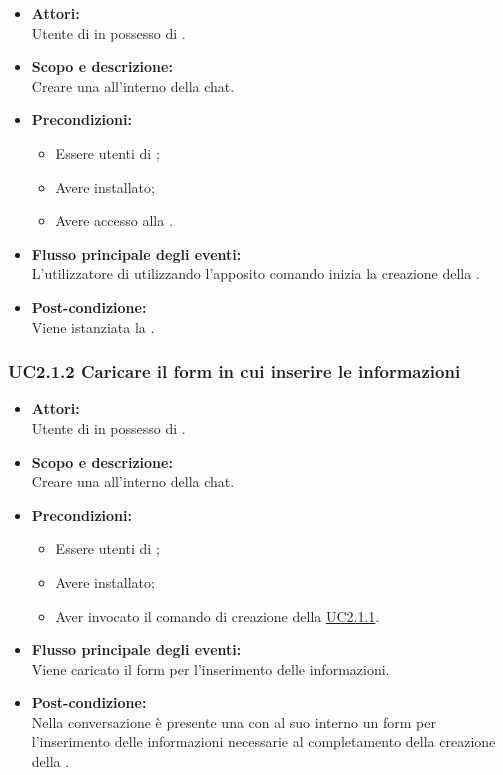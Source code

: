 \begin{itemize}
	\item \textbf{Attori:}
	\\Utente di  in possesso di \ProjectName{}.
	\item \textbf{Scopo e descrizione:} 
	\\Creare una  all'interno della chat.
	\item \textbf{Precondizioni:}
	\begin{itemize}
		\item Essere utenti di ;
		\item Avere \ProjectName{} installato;
		\item Avere accesso alla  .
	\end{itemize}
	\item \textbf{Flusso principale degli eventi:}
	\\L'utilizzatore di \ProjectName{} utilizzando l'apposito comando inizia la creazione della  .
	\item \textbf{Post-condizione:}
	\\Viene istanziata la .
\end{itemize}

\subsubsection{UC2.1.2 Caricare il form in cui inserire le informazioni} \label{UC2.1.2}

\begin{itemize}
	\item \textbf{Attori:}
	\\Utente di  in possesso di \ProjectName{}.
	\item \textbf{Scopo e descrizione:} 
	\\Creare una  all'interno della chat.
	\item \textbf{Precondizioni:}
	\begin{itemize}
		\item Essere utenti di ;
		\item Avere \ProjectName{} installato;
		\item Aver invocato il comando di creazione della  \hyperref[UC2.1.1]{UC2.1.1}.
	\end{itemize}
	\item \textbf{Flusso principale degli eventi:}
	\\Viene caricato il form per l'inserimento delle informazioni.
	\item \textbf{Post-condizione:}
	\\Nella conversazione è presente una   con al suo interno un form per l'inserimento delle informazioni necessarie al completamento della creazione della .
\end{itemize}

